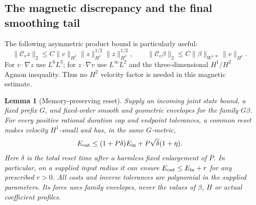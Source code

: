 \documentclass[11pt,a4paper]{amsart}
\newtheorem{lemma}[theorem]{Lemma}
\theoremstyle{definition}
\theoremstyle{remark}
\numberwithin{equation}{section}
\newcommand{\Ccal}{\mathcal C}
\newcommand{\norm}[1]{\lVert #1\rVert}
\begin{document}
\subsection{The magnetic discrepancy and the final smoothing tail}
The following asymmetric product bound is particularly useful:
\begin{equation}\label{eq:memory-product}
 \norm{\Ccal_vz}_2\le
 C\norm v_{H^1}\norm z_{H^1}^{1/2}\norm z_{H^2}^{1/2},
 \qquad
 \norm{\Ccal_v\beta}_2\le
 C\norm\beta_{W^{1,\infty}}\norm v_{H^1}.
\end{equation}
For $v\cdot\nabla z$ use $L^6L^3$; for $z\cdot\nabla v$ use
$L^\infty L^2$ and the three-dimensional $H^1/H^2$ Agmon inequality.
Thus no $H^2$ velocity factor is needed in this magnetic estimate.

\begin{lemma}[Memory-preserving reset]\label{lem:memory-reset}
Supply an incoming joint state bound, a fixed prefix $G$, and fixed-order
smooth and geometric envelopes for the family $G\beta$.  For every
positive rational duration cap and endpoint tolerances, a common reset
makes velocity $H^1$-small and has, in the same $G$-metric,
\begin{equation}\label{eq:memory-reset-endpoint}
 E_{\rm out}\le(1+P\delta)E_{\rm in}
                      +P\sqrt\delta(1+\eta).
\end{equation}
Here $\delta$ is the total reset time after a harmless fixed enlargement
of $P$.  In particular, on a supplied input radius it can ensure
$E_{\rm out}\le E_{\rm in}+r$ for any prescribed $r>0$.
All costs and inverse tolerances are polynomial in the supplied parameters.
Its force uses family envelopes, never the values of $\beta$, $H$ or
actual coefficient profiles.
\end{lemma}
\end{document}
